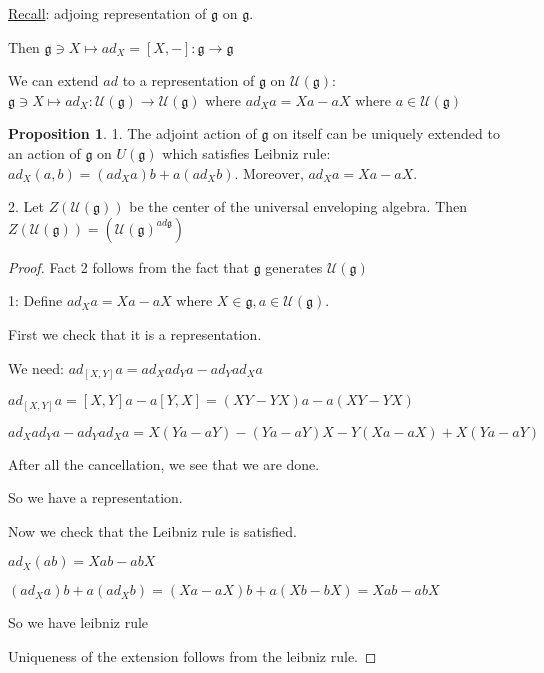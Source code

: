 \documentclass{article}
\theoremstyle{definition}
\newtheorem{proposition}{Proposition}
\begin{document}
\underline{Recall}: adjoing representation of \(\mathfrak{g} \) on \(\mathfrak{g} \).

Then \(\mathfrak{g}\ni X \mapsto ad_X = [X,-]:\mathfrak{g} \to \mathfrak{g}   \) 

We can extend \(ad\) to a representation of \(\mathfrak{g} \) on \(\mathcal{U} (\mathfrak{g} )\): \(\mathfrak{g} \ni X \mapsto ad_X : \mathcal{U} (\mathfrak{g} ) \to \mathcal{U} (\mathfrak{g} ) \) where \(ad_X a=Xa-aX\) where \(a\in \mathcal{U} (\mathfrak{g} )\) 

\begin{proposition}
    1. The adjoint action of \(\mathfrak{g} \) on itself can be uniquely extended to an action of \(\mathfrak{g}\) on \(U(\mathfrak{g})\) which satisfies Leibniz rule: \(ad_X(a,b) = (ad_X a)b + a(ad_X b)\). Moreover, \(ad_X a = Xa - aX\).

    2. Let \(Z(\mathcal{U} (\mathfrak{g} ))\) be the center of the universal enveloping algebra. Then \(Z(\mathcal{U} (\mathfrak{g} )) = (\mathcal{U} (\mathfrak{g} )^{ad\mathfrak{g}})\) 

\end{proposition}

\begin{proof}
    Fact 2 follows from the fact that \(\mathfrak{g} \) generates \(\mathcal{U} (\mathfrak{g} )\) 

    1: Define \(ad_X a = Xa - aX\) where \(X\in \mathfrak{g} , a\in \mathcal{U} (\mathfrak{g} )\).

    First we check that it is a representation.

    We need: \(ad_{[X,Y]}a = ad_X ad_Y a - ad_Y ad_X a\) 

    \(ad_{[X,Y]}a = [X,Y]a - a[Y,X] = (XY - YX)a - a(XY - YX)\) 
    
    \(ad_X ad_Y a - ad_Y ad_X a = X(Ya - aY) - (Ya - aY)X - Y(Xa - aX) + X(Ya - aY)\) 

    After all the cancellation, we see that we are done.

    So we have a representation.

    Now we check that the Leibniz rule is satisfied.

    \(ad_X(ab) = Xab - abX\) 

    \((ad_X a)b + a(ad_X b) = (Xa - aX)b + a(Xb - bX) = Xab - abX\) 

    So we have leibniz rule

    Uniqueness of the extension follows from the leibniz rule.

\end{proof}
\end{document}
